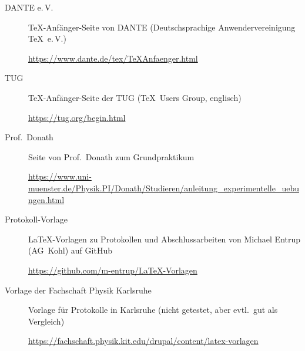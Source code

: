 \begin{frame}[<+->]
	\begin{description}
		\item[DANTE e.\,V.] \TeX-Anfänger-Seite von DANTE (Deutschsprachige Anwendervereinigung \TeX\ e.\,V.) 
		
		\url{https://www.dante.de/tex/TeXAnfaenger.html}
		\item[TUG] \TeX-Anfänger-Seite der TUG (\TeX\ Users Group, englisch) 
		
		\url{https://tug.org/begin.html}
	\end{description}
	\begin{description}
		\item[Prof.\ Donath] Seite von Prof.\ Donath zum Grundpraktikum
		
		\url{https://www.uni-muenster.de/Physik.PI/Donath/Studieren/anleitung_experimentelle_uebungen.html}
		\item[Protokoll-Vorlage] \LaTeX-Vorlagen zu Protokollen und Abschlussarbeiten von Michael Entrup (AG~Kohl) auf GitHub
		
		\url{https://github.com/m-entrup/LaTeX-Vorlagen}
		\item[Vorlage der Fachschaft Physik Karlsruhe] Vorlage für Protokolle in Karlsruhe (nicht getestet, aber evtl.\ gut als Vergleich)
		
		\url{https://fachschaft.physik.kit.edu/drupal/content/latex-vorlagen}
	\end{description}
\end{frame}


